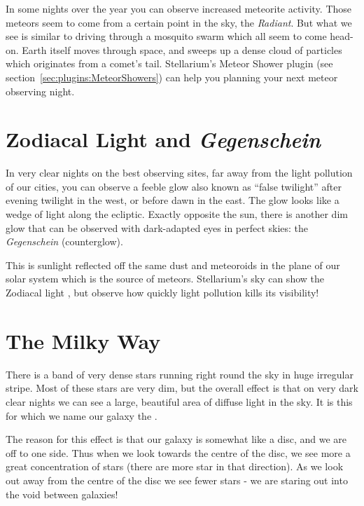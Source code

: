 In some nights over the year you can observe increased meteorite
activity. Those meteors seem to come from a certain point in the sky,
the \emph{Radiant}. But what we see is similar to driving through a
mosquito swarm which all seem to come head-on. Earth itself moves
through space, and sweeps up a dense cloud of particles which
originates from a comet's tail. Stellarium's Meteor Shower plugin (see
section~\ref{sec:plugins:MeteorShowers}) can help you planning your next
meteor observing night.

\section{Zodiacal Light and \emph{Gegenschein}}
\label{sec:Phenomena:ZodiacalLight}

In very clear nights on the best observing sites, far away from the
light pollution of our cities, you can observe a feeble glow also
known as ``false twilight'' after evening twilight in the west, or
before dawn in the east. The glow looks like a wedge of light along
the ecliptic. Exactly opposite the sun, there is another dim glow that
can be observed with dark-adapted eyes in perfect skies: the
\emph{Gegenschein} (counterglow). 

This is sunlight reflected off the same dust and meteoroids in the
plane of our solar system which is the source of meteors. Stellarium's
sky can show the Zodiacal light \citep{Kwon:2004:ZodiacalLight}, but
observe how quickly light pollution kills its visibility!


\section{The Milky Way}
\label{sec:Phenomena:MilkyWay}

There is a band of very dense stars running right round the sky in huge
irregular stripe. Most of these stars are very dim, but the overall
effect is that on very dark clear nights we can see a large, beautiful
area of diffuse light in the sky. It is this for which we name our
galaxy the .

The reason for this effect is that our galaxy is somewhat like a disc,
and we are off to one side. Thus when we look towards the centre of the
disc, we see more a great concentration of stars (there are more star in
that direction). As we look out away from the centre of the disc we see
fewer stars - we are staring out into the void between galaxies!

